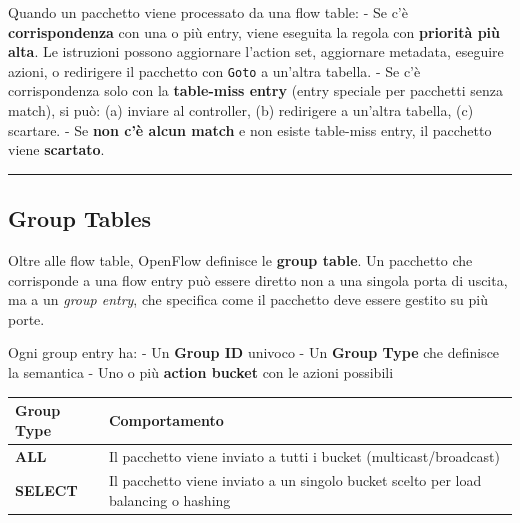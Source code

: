 \documentclass[
  italian,
  openany]{book}
\newcounter{none} %
\begin{document}
Quando un pacchetto viene processato da una flow table: - Se c'è
\textbf{corrispondenza} con una o più entry, viene eseguita la regola
con \textbf{priorità più alta}. Le istruzioni possono aggiornare
l'action set, aggiornare metadata, eseguire azioni, o redirigere il
pacchetto con \texttt{Goto} a un'altra tabella. - Se c'è corrispondenza
solo con la \textbf{table-miss entry} (entry speciale per pacchetti
senza match), si può: (a) inviare al controller, (b) redirigere a
un'altra tabella, (c) scartare. - Se \textbf{non c'è alcun match} e non
esiste table-miss entry, il pacchetto viene \textbf{scartato}.

\begin{center}\rule{0.5\linewidth}{0.5pt}\end{center}

\subsection{Group Tables}\label{group-tables}

Oltre alle flow table, OpenFlow definisce le \textbf{group table}. Un
pacchetto che corrisponde a una flow entry può essere diretto non a una
singola porta di uscita, ma a un \emph{group entry}, che specifica come
il pacchetto deve essere gestito su più porte.

Ogni group entry ha: - Un \textbf{Group ID} univoco - Un \textbf{Group
Type} che definisce la semantica - Uno o più \textbf{action bucket} con
le azioni possibili

{\def\LTcaptype{none} %
\begin{longtable}[]{@{}
  >{\raggedright\arraybackslash}p{}
  >{\raggedright\arraybackslash}p{}@{}}
\toprule\noalign{}
\begin{minipage}[b]{\linewidth}\raggedright
Group Type
\end{minipage} & \begin{minipage}[b]{\linewidth}\raggedright
Comportamento
\end{minipage} \\
\midrule\noalign{}
\endhead
\bottomrule\noalign{}
\endlastfoot
\textbf{ALL} & Il pacchetto viene inviato a tutti i bucket
(multicast/broadcast) \\
\textbf{SELECT} & Il pacchetto viene inviato a un singolo bucket scelto
per load balancing o hashing \\
\end{longtable}
}
\end{document}
